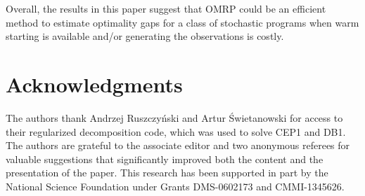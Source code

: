 \documentclass[12pt]{article}
\begin{document}
Overall, the results in this paper suggest that OMRP could be an efficient method to estimate optimality gaps for a class of stochastic programs when warm starting is available and/or generating the observations is costly.
 

\section*{Acknowledgments}
The authors thank Andrzej Ruszczy{\'{n}}ski and Artur {\'{S}}wietanowski for
access to their regularized decomposition code, which was used to solve CEP1 and DB1. 
The authors are grateful to the associate editor and two anonymous referees for valuable suggestions that significantly improved both the content and the presentation of the paper. 
This research has been supported in part by the National Science Foundation under Grants DMS-0602173 and CMMI-1345626.




\end{document}
